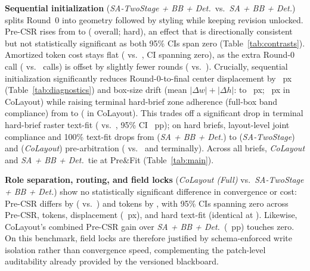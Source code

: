 \documentclass[conference]{IEEEtran}
\begin{document}
\textbf{Sequential initialization} (\emph{SA-TwoStage + BB + Det.}\ vs.\
\emph{SA + BB + Det.}) splits Round~0 into geometry followed by styling while
keeping revision unlocked. Pre-CSR rises from \vPreSABB{} to \vPreTwoStage{}
(\vDPreSeq{} overall; \vDPreSeqHard{} hard), an effect that is directionally
consistent but not statistically significant as both 95\% CIs span zero
(Table~\ref{tab:contrasts}). Amortized token cost stays flat (\vTokTwoStage{}
vs.\ \vTokSABB{}, CI spanning zero), as the extra Round-0 call
(\vCallsTwoStage{} vs.\ \vCallsSABB{} calls) is offset by slightly fewer rounds
(\vRndTwoStage{} vs.\ \vRndSABB{}). Crucially, sequential initialization
significantly reduces Round-0-to-final center displacement by \vDDispSeq{}~px
(Table~\ref{tab:diagnostics}) and box-size drift (mean $|\Delta w|+|\Delta h|$:
\vDwhSABB{} to \vDwhTwoStage{}~px; \vDwhFull{}~px in CoLayout) while raising terminal hard-brief zone adherence (full-box band compliance) from
\vZoneSABB{} to \vZoneTwoStage{} (\vZoneFull{} in CoLayout). This
trades off a significant \vDFitHardSeq{} drop in terminal hard-brief raster
text-fit (\vFitHardTwoStage{} vs.\ \vFitHardSABB{}, 95\% CI \vDFitHardSeqCI{}~pp);
on hard briefs, layout-level joint compliance and 100\% text-fit drops from
\vJointPreHardSABB{} (\emph{SA + BB + Det.}) to \vJointPreHardTwoStage{}
(\emph{SA-TwoStage}) and \vJointPreHardFull{} (\emph{CoLayout}) pre-arbitration
(\vJointFinHardSABB{} vs.\ \vJointFinHardTwoStage{} and \vJointFinHardFull{}
terminally). Across all briefs, \emph{CoLayout} and \emph{SA + BB + Det.}\ tie
at \vJointPreFull{} Pre\&Fit (Table~\ref{tab:main}).

\textbf{Role separation, routing, and field locks} (\emph{CoLayout (Full)} vs.\
\emph{SA-TwoStage + BB + Det.}) show no statistically significant difference in
convergence or cost: Pre-CSR differs by \vDPreLock{} (\vPreFull{} vs.\
\vPreTwoStage{}) and tokens by \vDTokLock{}, with 95\% CIs spanning zero across
Pre-CSR, tokens, displacement (\vDDispLock{}~px), and hard text-fit (identical
at \vFitHardFull{}). Likewise, CoLayout's combined Pre-CSR gain over \emph{SA +
BB + Det.}\ (\vDPreFullBB{}~pp) touches zero. On this benchmark, field locks are
therefore justified by schema-enforced write isolation rather than convergence
speed, complementing the patch-level auditability already provided by the
versioned blackboard.


\end{document}
